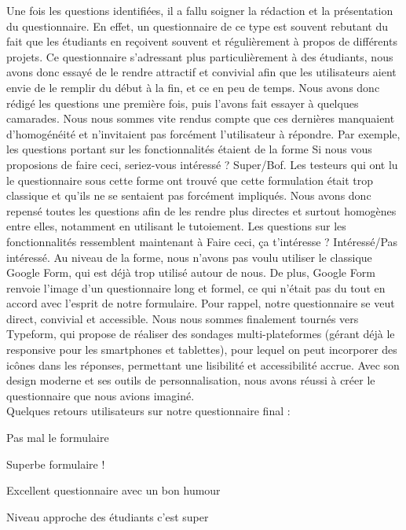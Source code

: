 Une fois les questions identifiées, il a fallu soigner la rédaction et la présentation du questionnaire. En effet, un questionnaire de ce type est souvent rebutant du fait que les étudiants en reçoivent souvent et régulièrement à propos de différents projets. Ce questionnaire s'adressant plus particulièrement à des étudiants, nous avons donc essayé de le rendre attractif et convivial afin que les utilisateurs aient envie de le remplir du début à la fin, et ce en peu de temps.
Nous avons donc rédigé les questions une première fois, puis l'avons fait essayer à quelques camarades. Nous nous sommes vite rendus compte que ces dernières manquaient d'homogénéité et n'invitaient pas forcément l'utilisateur à répondre. Par exemple, les questions portant sur les fonctionnalités étaient de la forme \og{}Si nous vous proposions de faire ceci, seriez-vous intéressé ? Super/Bof\fg{}. Les testeurs qui ont lu le questionnaire sous cette forme ont trouvé que cette formulation était trop classique et qu'ils ne se sentaient pas forcément impliqués. Nous avons donc repensé toutes les questions afin de les rendre plus directes et surtout homogènes entre elles, notamment en utilisant le tutoiement. Les questions sur les fonctionnalités ressemblent maintenant à \og{}Faire ceci, ça t'intéresse ? Intéressé/Pas intéressé\fg{}. \newline
Au niveau de la forme, nous n'avons pas voulu utiliser le classique Google Form, qui est déjà trop utilisé autour de nous. De plus, Google Form renvoie l'image d’un questionnaire long et formel, ce qui n'était pas du tout en accord avec l'esprit de notre formulaire. Pour rappel, notre questionnaire se veut direct, convivial et accessible. Nous nous sommes finalement tournés vers Typeform, qui propose de réaliser des sondages multi-plateformes (gérant déjà le responsive pour les smartphones et tablettes), pour lequel on peut incorporer des icônes dans les réponses, permettant une lisibilité et accessibilité accrue. Avec son design moderne et ses outils de personnalisation, nous avons réussi à créer le questionnaire que nous avions imaginé. \\

Quelques retours utilisateurs sur notre questionnaire final :\\
\begin{description}
    \item \og{}Pas mal le formulaire\fg{}
    \item \og{}Superbe formulaire !\fg{}
    \item \og{}Excellent questionnaire avec un bon humour\fg{}
    \item \og{}Niveau approche des étudiants c’est super\fg{}
\end{description}

